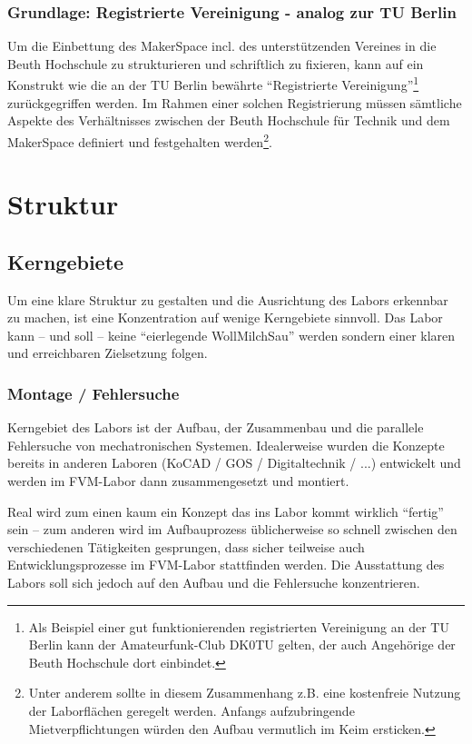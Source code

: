 \documentclass[parskip=half,headsepline,footsepline,titlepage]{scrartcl}
\begin{document}
\subsubsection{Grundlage: Registrierte Vereinigung - analog zur TU Berlin}
Um die Einbettung des MakerSpace incl. des unterstützenden Vereines in die Beuth Hochschule zu strukturieren und schriftlich zu fixieren, kann auf ein Konstrukt wie die an der TU Berlin bewährte ``Registrierte Vereinigung''\footnote{Als Beispiel einer gut funktionierenden registrierten Vereinigung an der TU Berlin kann der Amateurfunk-Club DK0TU gelten, der auch Angehörige der Beuth Hochschule dort einbindet.} zurückgegriffen werden.
Im Rahmen einer solchen Registrierung müssen sämtliche Aspekte des Verhältnisses zwischen der Beuth Hochschule für Technik und dem MakerSpace definiert und festgehalten werden\footnote{Unter anderem sollte in diesem Zusammenhang z.B. eine kostenfreie Nutzung der Laborflächen geregelt werden. Anfangs aufzubringende Mietverpflichtungen würden den Aufbau vermutlich im Keim ersticken.}.


\section{Struktur}

\subsection{Kerngebiete}
Um eine klare Struktur zu gestalten und die Ausrichtung des Labors erkennbar zu machen, ist eine Konzentration auf wenige Kerngebiete sinnvoll. Das Labor kann -- und soll -- keine ``eierlegende WollMilchSau'' werden sondern einer klaren und erreichbaren Zielsetzung folgen.

\subsubsection{Montage / Fehlersuche}
Kerngebiet des Labors ist der Aufbau, der Zusammenbau und die parallele Fehlersuche von mechatronischen Systemen. Idealerweise wurden die Konzepte bereits in anderen Laboren (KoCAD / GOS / Digitaltechnik / ...) entwickelt und werden im FVM-Labor dann zusammengesetzt und montiert. 

Real wird zum einen kaum ein Konzept das ins Labor kommt wirklich ``fertig'' sein -- zum anderen wird im Aufbauprozess üblicherweise so schnell zwischen den verschiedenen Tätigkeiten gesprungen, dass sicher teilweise auch Entwicklungsprozesse im FVM-Labor stattfinden werden. Die Ausstattung des Labors soll sich jedoch auf den Aufbau und die Fehlersuche konzentrieren.
\end{document}
